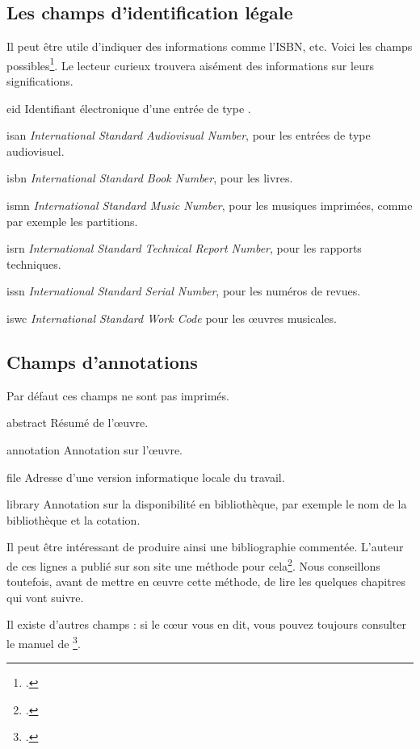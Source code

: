 \subsection{Les champs d'identification légale}

Il peut être utile d'indiquer des informations comme l'ISBN, etc. Voici les champs possibles\footcite[Par défaut,  imprime ces champs s'ils sont remplis. Il est toutefois possible de ne pas les afficher en passant l'option  au chargement du package, voir:][]{biblatex_isbn}.  Le lecteur curieux trouvera aisément des informations sur leurs significations.

\begin{choix}
	\item[eid] Identifiant électronique d'une entrée de type . 
   	\item[isan] \emph{\textenglish{International Standard Audiovisual Number}}, pour les entrées de type audiovisuel.
   	\item[isbn] \emph{\textenglish{International Standard Book Number}}, pour les livres. 
   	\item[ismn] \emph{\textenglish{International Standard Music Number}}, pour les musiques imprimées, comme par exemple les partitions. 
   	\item[isrn] \emph{\textenglish{International Standard Technical Report Number}}, pour les rapports techniques. 
   	\item[issn] \emph{\textenglish{International Standard Serial Number}}, pour les numéros de revues. 
   	\item[iswc] \emph{\textenglish{International Standard Work Code}} pour les œuvres musicales.
\end{choix}

\subsection{Champs d'annotations}

Par défaut ces champs ne sont pas imprimés. 

\begin{choix}
	\item[abstract] Résumé de l'œuvre. 
   	\item[annotation] Annotation sur l'œuvre.
   	\item[file] Adresse d'une version informatique locale du travail. 
   	\item[library] Annotation sur la disponibilité en bibliothèque, par exemple  le nom de la bibliothèque et la cotation.
\end{choix}

\begin{plusloins}
Il peut être intéressant de produire ainsi une bibliographie commentée. L'auteur de ces lignes a publié sur son site une méthode pour cela\footcite{biblio_commentee}. Nous conseillons toutefois, avant de mettre en œuvre cette méthode, de lire les quelques chapitres qui vont suivre.
\end{plusloins}

Il existe d'autres champs : si le cœur vous en dit, vous pouvez toujours consulter le manuel de \footcite{biblatex_champs}.
